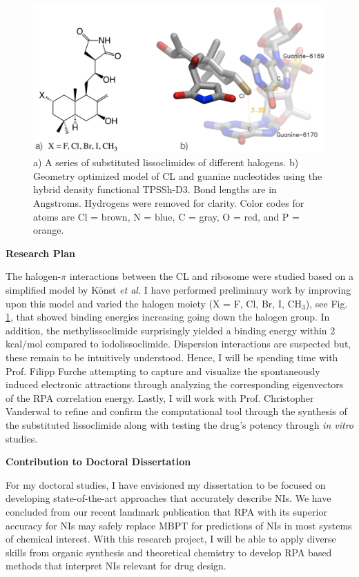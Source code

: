 \documentclass[11pt]{article}
\begin{document}
\begin{figure}
  \vspace{-20pt}
  \centering
  \includegraphics[scale=0.12]{combined.png}
  \caption{a) A series of substituted lissoclimides of different halogens.
    b) Geometry optimized model of CL and guanine nucleotides using the hybrid
    density functional TPSSh-D3.\autocite{Staroverov03JChemPhys119p12129,Grimme12ChemEurJ18p9955}
    Bond lengths are in Angstroms. Hydrogens were removed for clarity. Color codes
    for atoms are Cl = brown, N = blue, C = gray, O = red, and P = orange.\vspace{-11pt}}
  \label{fig:model}
\end{figure}

\textbf{Research Plan}

The halogen-$\pi$ interactions between the CL and ribosome were
studied based on a simplified model by K{\"o}nst \textit{et al.}\autocite{Konst2017}
I have performed preliminary work by improving upon this model and
varied the halogen moiety (X = F, Cl, Br, I, CH$_3$), see Fig. \ref{fig:model},
that showed binding energies increasing going down the halogen group. In addition,
the methylissoclimide surprisingly yielded a binding energy within 2
kcal/mol compared to iodolissoclimide. Dispersion interactions are suspected
but, these remain to be intuitively understood. Hence, I will be spending time with
Prof. Filipp Furche attempting to capture and visualize the spontaneously induced
electronic attractions through analyzing the corresponding eigenvectors of the RPA
correlation energy. Lastly, I will work with Prof. Christopher Vanderwal to refine
and confirm the computational tool through the synthesis of the substituted lissoclimide
along with testing the drug's potency through \textit{in vitro} studies.

\textbf{Contribution to Doctoral Dissertation}

For my doctoral studies, I have envisioned my dissertation
to be focused on developing state-of-the-art approaches that accurately
describe NIs. We have concluded from our recent landmark publication that
RPA with its superior accuracy for NIs may safely replace MBPT for predictions
of NIs in most systems of chemical interest.\autocite{Nguyen20JChemTheoryComput16p2258}
With this research project, I will be able to apply diverse skills from
organic synthesis and theoretical chemistry to develop RPA based methods
that interpret NIs relevant for drug design.

\printbibliography
\end{document}
